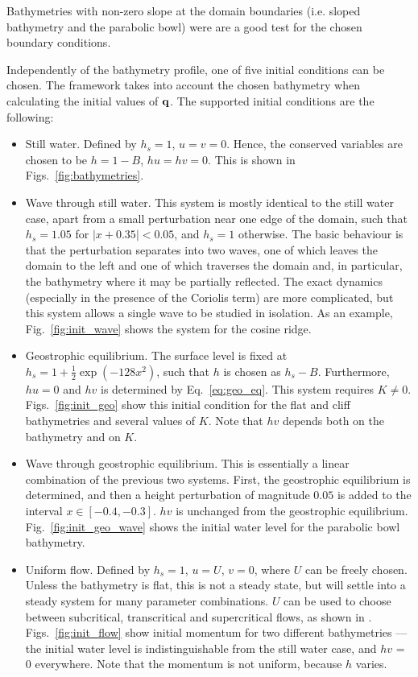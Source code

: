Bathymetries with non-zero slope at the domain boundaries (i.e. sloped bathymetry and the parabolic bowl) were are a good test for the chosen boundary conditions.

Independently of the bathymetry profile, one of five initial conditions can be chosen. The framework takes into account the chosen bathymetry when calculating the initial values of $\vb q$. The supported initial conditions are the following:

\begin{itemize}
  \item Still water. Defined by $h_s = 1$, $u = v = 0$. Hence, the conserved variables are chosen to be $h = 1 - B$, $hu = hv = 0$. This is shown in Figs.~\ref{fig:bathymetries}.
  \item Wave through still water. This system is mostly identical to the still water case, apart from a small perturbation near one edge of the domain, such that $h_s = 1.05$ for $|x + 0.35| < 0.05$, and $h_s = 1$ otherwise. The basic behaviour is that the perturbation separates into two waves, one of which leaves the domain to the left and one of which traverses the domain and, in particular, the bathymetry where it may be partially reflected. The exact dynamics (especially in the presence of the Coriolis term) are more complicated, but this system allows a single wave to be studied in isolation. As an example, Fig.~\ref{fig:init_wave} shows the system for the cosine ridge.
  \item Geostrophic equilibrium. The surface level is fixed at $h_s = 1 + \frac{1}{2} \exp (-128 x^2)$, such that $h$ is chosen as $h_s - B$. Furthermore, $hu = 0$ and $hv$ is determined by Eq.~\ref{eq:geo_eq}. This system requires $K \neq 0$. Figs.~\ref{fig:init_geo} show this initial condition for the flat and cliff bathymetries and several values of $K$. Note that $hv$ depends both on the bathymetry and on $K$.
  \item Wave through geostrophic equilibrium. This is essentially a linear combination of the previous two systems. First, the geostrophic equilibrium is determined, and then a height perturbation of magnitude $0.05$ is added to the interval $x \in [-0.4, -0.3]$. $hv$ is unchanged from the geostrophic equilibrium. Fig.~\ref{fig:init_geo_wave} shows the initial water level for the parabolic bowl bathymetry.
  \item Uniform flow. Defined by $h_s = 1$, $u = U$, $v = 0$, where $U$ can be freely chosen. Unless the bathymetry is flat, this is not a steady state, but will settle into a steady system for many parameter combinations. $U$ can be used to choose between subcritical, transcritical and supercritical flows, as shown in \cite{esler2005steady}. Figs.~\ref{fig:init_flow} show initial momentum for two different bathymetries --- the initial water level is indistinguishable from the still water case, and $hv$ = 0 everywhere. Note that the momentum is not uniform, because $h$ varies.
\end{itemize}

